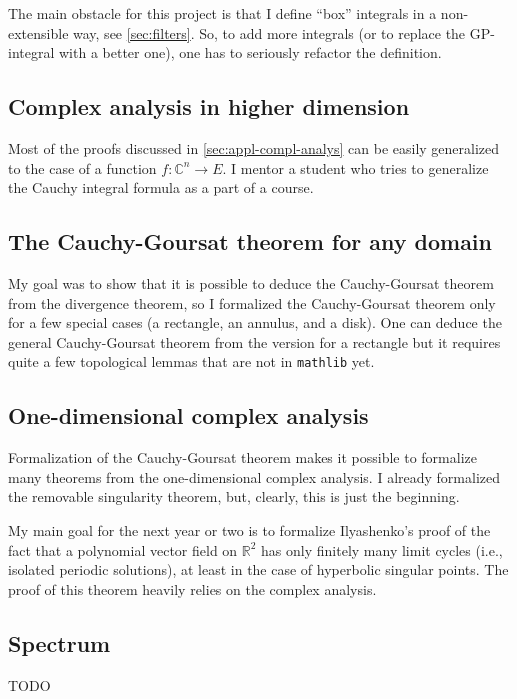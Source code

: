 \documentclass[a4paper, UKenglish,cleveref, autoref, thm-restate]{lipics-v2021}
\newcommand{\bbR}{\mathbb{R}}
\newcommand{\bbC}{\mathbb{C}}
\begin{document}
The main obstacle for this project is that I define \enquote{box}
integrals in a non-extensible way, see \autoref{sec:filters}. So, to
add more integrals (or to replace the GP-integral with a better one),
one has to seriously refactor the definition.

\subsection{Complex analysis in higher dimension}%
\label{sec:compl-analys-high}

Most of the proofs discussed in \autoref{sec:appl-compl-analys} can be
easily generalized to the case of a function
\(f\colon \bbC^{n}\to E\). I mentor a student who tries to generalize
the Cauchy integral formula as a part of a course.

\subsection{The Cauchy-Goursat theorem for any domain}\label{sec:cauchy-goursat-any}

My goal was to show that it is possible to deduce the Cauchy-Goursat
theorem from the divergence theorem, so I formalized the
Cauchy-Goursat theorem only for a few special cases (a rectangle, an
annulus, and a disk). One can deduce the general Cauchy-Goursat
theorem from the version for a rectangle but it requires quite a few
topological lemmas that are not in \texttt{mathlib} yet.

\subsection{One-dimensional complex analysis}%
\label{sec:one-dimens-compl}

Formalization of the Cauchy-Goursat theorem makes it possible to
formalize many theorems from the one-dimensional complex analysis. I
already formalized the removable singularity theorem, but, clearly,
this is just the beginning.

My main goal for the next year or two is to formalize Ilyashenko's
proof of the fact that a polynomial vector field on \(\bbR^{2}\) has
only finitely many limit cycles (i.e., isolated periodic solutions),
at least in the case of hyperbolic singular points. The proof of this
theorem heavily relies on the complex analysis.

\subsection{Spectrum}%
\label{sec:spectrum}

TODO


\end{document}
